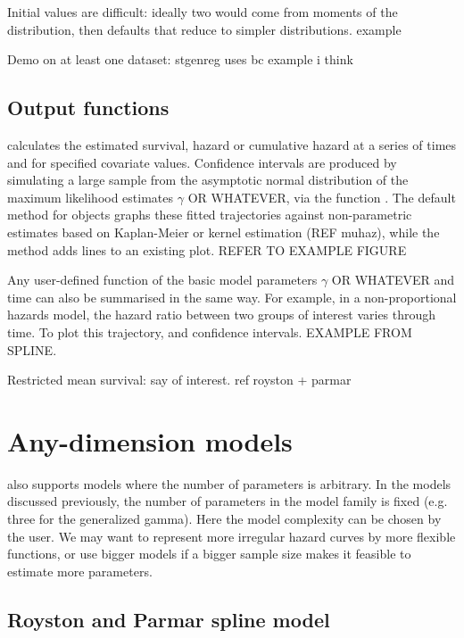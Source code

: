 \documentclass[nojss,nofooter]{jss}
\begin{document}
Initial values are difficult: ideally two would come from moments of
the distribution, then defaults that reduce to simpler distributions.
example

Demo on at least one dataset: stgenreg uses bc example i think




\subsection{Output functions}

 calculates the estimated survival, hazard
or cumulative hazard at a series of times and for specified covariate
values. Confidence intervals are produced by simulating a large sample
from the asymptotic normal distribution of the maximum likelihood
estimates $\gamma$ OR WHATEVER, via the function
.  The default  method for
 objects graphs these fitted trajectories against
non-parametric estimates based on Kaplan-Meier or kernel estimation
(REF muhaz), while the  method adds lines to an existing
plot.  REFER TO EXAMPLE FIGURE

Any user-defined function of the basic model parameters $\gamma$ OR
WHATEVER and time can also be summarised in the same way.  For
example, in a non-proportional hazards model, the hazard ratio between
two groups of interest varies through time.  To plot this trajectory,
and confidence intervals.   EXAMPLE FROM SPLINE. 

Restricted mean survival: say of interest. ref royston + parmar


\section{Any-dimension models}

 also supports models where the number of parameters is
arbitrary.  In the models discussed previously, the number of
parameters in the model family is fixed (e.g. three for the
generalized gamma).  Here the model complexity can be chosen by the
user.  We may want to represent more irregular hazard
curves by more flexible functions, or use bigger models if a bigger
sample size makes it feasible to estimate more parameters.


\subsection{Royston and Parmar spline model}
\end{document}
